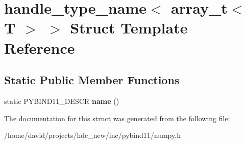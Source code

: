 \hypertarget{structhandle__type__name_3_01array__t_3_01_t_01_4_01_4}{}\section{handle\+\_\+type\+\_\+name$<$ array\+\_\+t$<$ T $>$ $>$ Struct Template Reference}
\label{structhandle__type__name_3_01array__t_3_01_t_01_4_01_4}
\subsection*{Static Public Member Functions}
\begin{DoxyCompactItemize}
\item 
static P\+Y\+B\+I\+N\+D11\+\_\+\+D\+E\+S\+CR {\bfseries name} ()\hypertarget{structhandle__type__name_3_01array__t_3_01_t_01_4_01_4_a74bc210bbcec92f8d066eac66e4aaf9f}{}\label{structhandle__type__name_3_01array__t_3_01_t_01_4_01_4_a74bc210bbcec92f8d066eac66e4aaf9f}

\end{DoxyCompactItemize}


The documentation for this struct was generated from the following file\+:\begin{DoxyCompactItemize}
\item 
/home/david/projects/hdc\+\_\+new/inc/pybind11/numpy.\+h\end{DoxyCompactItemize}
